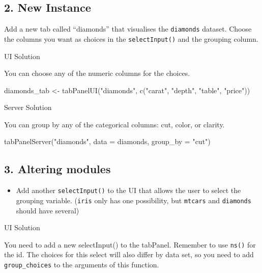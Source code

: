 \documentclass[
]{book}
\newenvironment{Shaded}{\begin{snugshade}}{\end{snugshade}}
\newcommand{\AttributeTok}[1]{\textcolor[rgb]{0.77,0.63,0.00}{#1}}
\newcommand{\FunctionTok}[1]{\textcolor[rgb]{0.00,0.00,0.00}{#1}}
\newcommand{\NormalTok}[1]{#1}
\newcommand{\OtherTok}[1]{\textcolor[rgb]{0.56,0.35,0.01}{#1}}
\newcommand{\StringTok}[1]{\textcolor[rgb]{0.31,0.60,0.02}{#1}}
\providecommand{\tightlist}{%
  \setlength{\itemsep}{0pt}\setlength{\parskip}{0pt}}
\begin{document}
\hypertarget{new-instance}{%
\subsection{2. New Instance}\label{new-instance}}

Add a new tab called ``diamonds'' that visualises the \texttt{diamonds} dataset. Choose the columns you want as choices in the \texttt{selectInput()} and the grouping column.

UI Solution

You can choose any of the numeric columns for the choices.

\begin{Shaded}
\begin{Highlighting}[]
\NormalTok{diamonds\_tab }\OtherTok{\textless{}{-}} \FunctionTok{tabPanelUI}\NormalTok{(}\StringTok{"diamonds"}\NormalTok{, }\FunctionTok{c}\NormalTok{(}\StringTok{"carat"}\NormalTok{, }\StringTok{"depth"}\NormalTok{, }\StringTok{"table"}\NormalTok{, }\StringTok{"price"}\NormalTok{))}
\end{Highlighting}
\end{Shaded}

Server Solution

You can group by any of the categorical columns: cut, color, or clarity.

\begin{Shaded}
\begin{Highlighting}[]
\FunctionTok{tabPanelServer}\NormalTok{(}\StringTok{"diamonds"}\NormalTok{, }\AttributeTok{data =}\NormalTok{ diamonds, }\AttributeTok{group\_by =} \StringTok{"cut"}\NormalTok{)}
\end{Highlighting}
\end{Shaded}

\hypertarget{altering-modules}{%
\subsection{3. Altering modules}\label{altering-modules}}

\begin{itemize}
\tightlist
\item
  Add another \texttt{selectInput()} to the UI that allows the user to select the grouping variable. (\texttt{iris} only has one possibility, but \texttt{mtcars} and \texttt{diamonds} should have several)
\end{itemize}

UI Solution

You need to add a new selectInput() to the tabPanel. Remember to use \texttt{ns()} for the id. The choices for this select will also differ by data set, so you need to add \texttt{group\_choices} to the arguments of this function.
\end{document}
